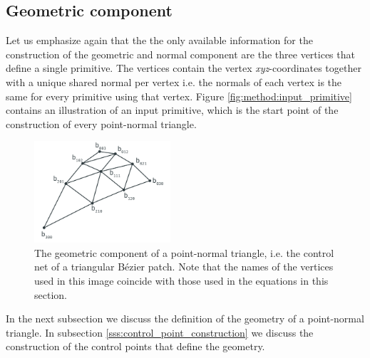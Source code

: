 
\subsection{Geometric component}
\label{ss:geometric_component}
Let us emphasize again that the the only available information for the construction of the geometric and normal component are the three vertices that define a single primitive. The vertices contain the vertex \textit{xyz}-coordinates together with a unique shared normal per vertex i.e. the normals of each vertex is the same for every primitive using that vertex. Figure \ref{fig:method:input_primitive} contains an illustration of an input primitive, which is the start point of the construction of every point-normal triangle.

\begin{figure}
	\centering
	\includegraphics[width=0.45\textwidth]{./content/img/method/geometry.png}
	\caption{The geometric component of a point-normal triangle, i.e. the control net of a triangular Bézier patch. Note that the names of the vertices used in this image coincide with those used in the equations in this section.}
	\label{fig:method:control_net}
\end{figure}
%
%
In the next subsection we discuss the definition of the geometry of a point-normal triangle. In subsection \ref{sss:control_point_construction} we discuss the construction of the control points that define the geometry. 

